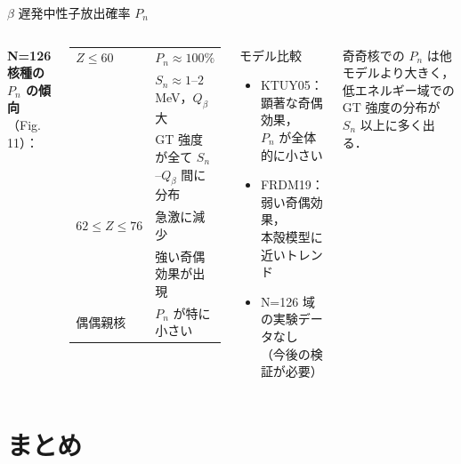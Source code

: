 \documentclass[aspectratio=169,12pt]{beamer}
\begin{document}
\begin{frame}{$\beta$ 遅発中性子放出確率 $P_n$}
  \begin{columns}
    \textbf{N=126 核種の $P_n$ の傾向}（Fig. 11）：

    \begin{center}
    \renewcommand{\arraystretch}{1.3}
    \begin{tabular}{ll}
      \toprule
      $Z \leq 60$ & $P_n \approx 100\%$ \\
      & $S_n \approx 1$--$2$ MeV，$Q_\beta$ 大\\
      & GT 強度が全て $S_n$--$Q_\beta$ 間に分布 \\
      \midrule
      $62 \leq Z \leq 76$ & 急激に減少 \\
      & 強い奇偶効果が出現 \\
      \midrule
      偶偶親核 & $P_n$ が特に小さい \\
      \bottomrule
    \end{tabular}
    \end{center}

    \begin{block}{モデル比較}
      \begin{itemize}
        \item KTUY05：顕著な奇偶効果，\\$P_n$ が全体的に小さい
        \item FRDM19：弱い奇偶効果，\\本殻模型に近いトレンド
        \item \alert{N=126 域の実験データなし}\\（今後の検証が必要）
      \end{itemize}
    \end{block}

    \vspace{0.3em}
    奇奇核での $P_n$ は他モデルより大きく，
    低エネルギー域での GT 強度の分布が $S_n$ 以上に多く出る．
  \end{columns}
\end{frame}

\section{まとめ}
\end{document}
